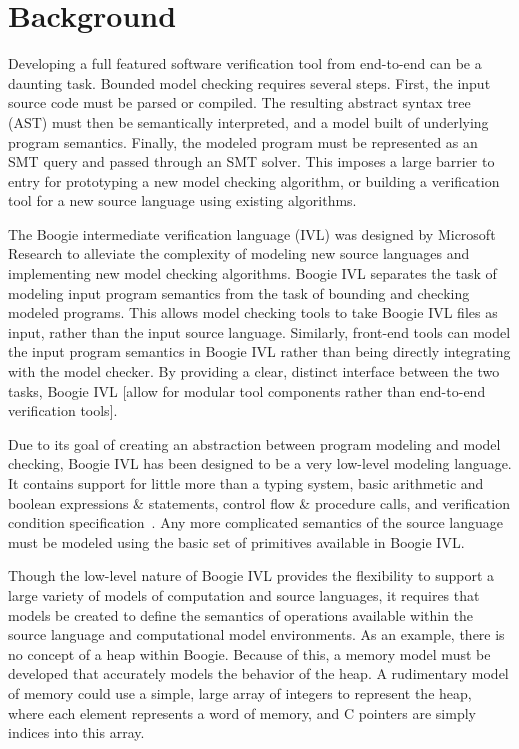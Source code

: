 \chapter{Background}\label{ch:background}
Developing a full featured software verification tool from end-to-end can be a daunting task.  Bounded model checking requires several steps.  First, the input source code must be parsed or compiled.  The resulting abstract syntax tree (AST) must then be semantically interpreted, and a model built of underlying program semantics.  Finally, the modeled program must be represented as an SMT query and passed through an SMT solver.  This imposes a large barrier to entry for prototyping a new model checking algorithm, or building a verification tool for a new source language using existing algorithms.

The Boogie intermediate verification language (IVL) was designed by Microsoft Research to alleviate the complexity of modeling new source languages and implementing new model checking algorithms.  Boogie IVL separates the task of modeling input program semantics from the task of bounding and checking modeled programs.  This allows model checking tools to take Boogie IVL files as input, rather than the input source language.  Similarly, front-end tools can model the input program semantics in Boogie IVL rather than being directly integrating with the model checker.  By providing a clear, distinct interface between the two tasks, Boogie IVL [allow for modular tool components rather than end-to-end verification tools].

Due to its goal of creating an abstraction between program modeling and model checking, Boogie IVL has been designed to be a very low-level modeling language.  It contains support for little more than a typing system, basic arithmetic and boolean expressions \& statements, control flow \& procedure calls, and verification condition specification~\cite{boogie}.  Any more complicated semantics of the source language must be modeled using the basic set of primitives available in Boogie IVL.

Though the low-level nature of Boogie IVL provides the flexibility to support a large variety of models of computation and source languages, it requires that models be created to define the semantics of operations available within the source language and computational model environments.  As an example, there is no concept of a heap within Boogie.  Because of this, a memory model must be developed that accurately models the behavior of the heap.  A rudimentary model of memory could use a simple, large array of integers to represent the heap, where each element represents a word of memory, and C pointers are simply indices into this array.

